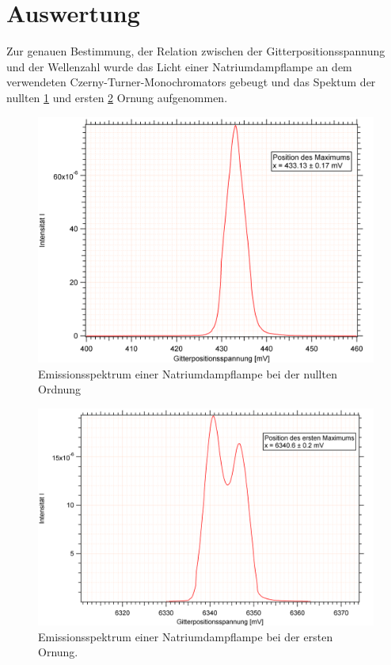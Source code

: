 


\section {Auswertung}

Zur genauen Bestimmung, der Relation zwischen der Gitterpositionsspannung und der Wellenzahl wurde das Licht einer Natriumdampflampe an dem verwendeten Czerny-Turner-Monochromators gebeugt und das Spektum der nullten \ref{Null} und ersten \ref{Eins} Ornung aufgenommen. 


\begin{figure}[H]
	\centering	
	\begin{minipage}{1\textwidth}
	\includegraphics[width=\columnwidth]{Bilder/Graph1.png}
	\end{minipage}
	
	
	\caption{Emissionsspektrum einer Natriumdampflampe bei der nullten Ordnung}
	

	\label{Null}
\end{figure}
\begin{figure}[H]
	\centering	
	\begin{minipage}{1\textwidth}
	\includegraphics[width=\columnwidth]{Bilder/Graph2.png}
	\end{minipage}
	
	
	\caption{Emissionsspektrum einer Natriumdampflampe bei der ersten Ornung.}
	
	
	\label{Eins}
\end{figure}
